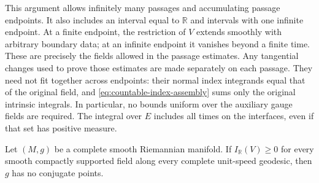 This argument allows infinitely many passages and accumulating passage
endpoints.  It also includes an interval equal to $\mathbb R$ and
intervals with one infinite endpoint.  At a finite endpoint, the
restriction of $V$ extends smoothly with arbitrary boundary data; at an
infinite endpoint it vanishes beyond a finite time.  These are precisely
the fields allowed in the passage estimates.  Any tangential changes
used to prove those estimates are made separately on each passage.
They need not fit together across endpoints: their normal index
integrands equal that of the original field, and
\eqref{eq:countable-index-assembly} sums only the original intrinsic
integrals.  In particular, no bounds uniform over the auxiliary gauge
fields are required.  The integral over $E$ includes all times on the
interfaces, even if that set has positive measure.

\begin{lemma}
\label{lem:index-criterion}
Let $(M,g)$ be a complete smooth Riemannian manifold.  If
$I_{\mathbb R}(V)\geq0$ for every smooth compactly supported field along
every complete unit-speed geodesic, then $g$ has no conjugate points.
\end{lemma}

